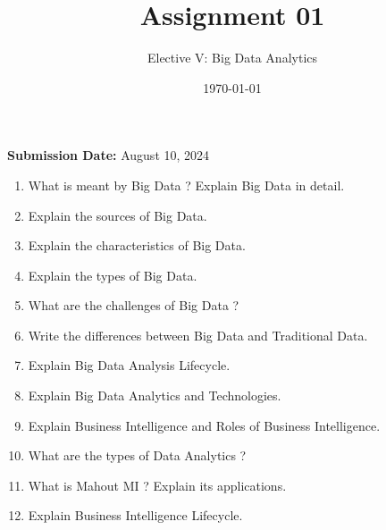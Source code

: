 \documentclass[12pt,a4paper]{article}
\title{Assignment 01}
\author{Elective V: Big Data Analytics}
\date{\today}
\begin{document}
\maketitle

\noindent \textbf{Submission Date:} August 10, 2024

\begin{enumerate}[label=\textbf{\arabic*.}, leftmargin=*]
    \item What is meant by Big Data ? Explain Big Data in detail.
    
    \item Explain the sources of Big Data.
    
    \item Explain the characteristics of Big Data.
    
    \item Explain the types of Big Data.
    
    \item What are the challenges of Big Data ?
    
    \item Write the differences between Big Data and Traditional Data.
    
    \item Explain Big Data Analysis Lifecycle.
    
    \item Explain Big Data Analytics and Technologies.
    
    \item Explain Business Intelligence and Roles of Business Intelligence.
    
    \item What are the types of Data Analytics ?
    
    \item What is Mahout MI ? Explain its applications.
    
    \item Explain Business Intelligence Lifecycle.
\end{enumerate}
\end{document}
